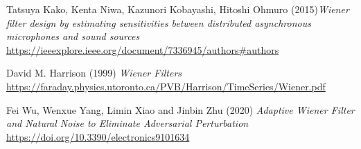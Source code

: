 \documentclass[conference,onecolumn]{IEEEtran}
\begin{document}
\begin{flushleft}
\begin{thebibliography}{100}
Tatsuya Kako, Kenta Niwa, Kazunori Kobayashi, Hitoshi Ohmuro (2015)\textit{Wiener filter design by estimating sensitivities between distributed asynchronous microphones and sound sources} \href{https://ieeexplore.ieee.org/document/7336945/authors#authors}{https://ieeexplore.ieee.org/document/7336945/authors\#authors}

David M. Harrison (1999) \textit{Wiener Filters} \href{https://faraday.physics.utoronto.ca/PVB/Harrison/TimeSeries/Wiener.pdf}{https://faraday.physics.utoronto.ca/PVB/Harrison/TimeSeries/Wiener.pdf}

Fei Wu, Wenxue Yang, Limin Xiao and Jinbin Zhu (2020) \textit{Adaptive Wiener Filter and Natural Noise to Eliminate Adversarial Perturbation} \href{https://doi.org/10.3390/electronics9101634}{https://doi.org/10.3390/electronics9101634}


\end{thebibliography}
\end{flushleft}
\end{document}
